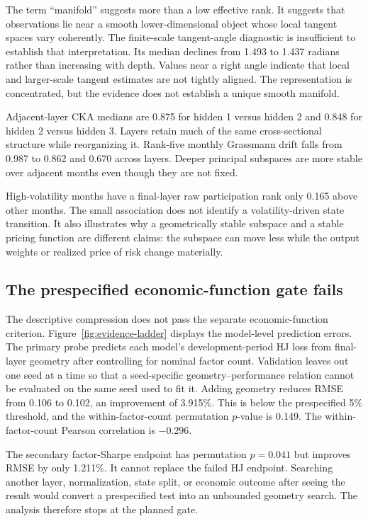 The term ``manifold'' suggests more than a low effective rank. It suggests that observations lie near a smooth lower-dimensional object whose local tangent spaces vary coherently. The finite-scale tangent-angle diagnostic is insufficient to establish that interpretation. Its median declines from 1.493 to 1.437 radians rather than increasing with depth. Values near a right angle indicate that local and larger-scale tangent estimates are not tightly aligned. The representation is concentrated, but the evidence does not establish a unique smooth manifold.

Adjacent-layer CKA medians are 0.875 for hidden 1 versus hidden 2 and 0.848 for hidden 2 versus hidden 3. Layers retain much of the same cross-sectional structure while reorganizing it. Rank-five monthly Grassmann drift falls from 0.987 to 0.862 and 0.670 across layers. Deeper principal subspaces are more stable over adjacent months even though they are not fixed.

High-volatility months have a final-layer raw participation rank only 0.165 above other months. The small association does not identify a volatility-driven state transition. It also illustrates why a geometrically stable subspace and a stable pricing function are different claims: the subspace can move less while the output weights or realized price of risk change materially.

\subsection{The prespecified economic-function gate fails}

The descriptive compression does not pass the separate economic-function criterion. Figure~\ref{fig:evidence-ladder} displays the model-level prediction errors. The primary probe predicts each model's development-period HJ loss from final-layer geometry after controlling for nominal factor count. Validation leaves out one seed at a time so that a seed-specific geometry--performance relation cannot be evaluated on the same seed used to fit it. Adding geometry reduces RMSE from 0.106 to 0.102, an improvement of 3.915\%. This is below the prespecified 5\% threshold, and the within-factor-count permutation $p$-value is 0.149. The within-factor-count Pearson correlation is $-0.296$.

The secondary factor-Sharpe endpoint has permutation $p=0.041$ but improves RMSE by only 1.211\%. It cannot replace the failed HJ endpoint. Searching another layer, normalization, state split, or economic outcome after seeing the result would convert a prespecified test into an unbounded geometry search. The analysis therefore stops at the planned gate.

